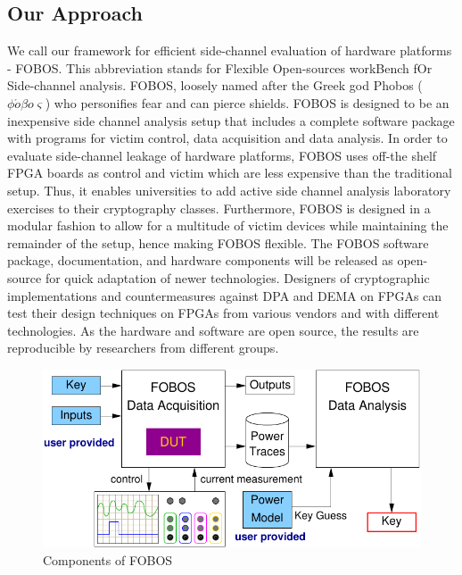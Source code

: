 \documentclass{llncs}
\numberwithin{algorithm}{chapter}
\begin{document}
\subsection{Our Approach}
We call our framework for efficient side-channel evaluation of 
hardware platforms - FOBOS. This abbreviation stands for
Flexible Open-sources workBench fOr Side-channel analysis.
FOBOS, loosely named after the Greek god Phobos ($\phi \acute{o} \beta o \varsigma$)
who personifies fear and can pierce shields. FOBOS is designed to be an inexpensive 
side channel analysis setup that includes a complete software package with programs for 
victim control, data acquisition and data analysis. In order to evaluate
side-channel leakage of hardware platforms, FOBOS uses off-the shelf FPGA boards
as control and victim which are less expensive than the traditional setup.
Thus, it enables universities to add active side channel analysis laboratory exercises
to their cryptography classes. 
Furthermore, FOBOS is designed in a modular fashion 
to allow for a multitude of victim devices while maintaining the remainder of the setup,
hence making FOBOS flexible. 
The FOBOS software package, documentation, and hardware components will be released
as open-source for quick adaptation of newer technologies.
Designers of cryptographic implementations and countermeasures against DPA and DEMA on FPGAs 
can test their design techniques on FPGAs from various vendors and with different technologies.
As the hardware and software are open source, the results are 
reproducible by researchers from different groups.
%
\begin{figure}[ht]
\vspace{-2ex}
\begin{center}
\includegraphics[scale=0.8]{figures/fobos-top}
\caption{\label{fig:fobos-top}Components of FOBOS}
\end{center} 
\vspace{-3ex}
\end{figure}
\end{document}
